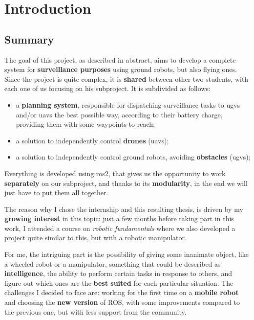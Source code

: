 \chapter{Introduction} %
\label{cha:intro}

\section{Summary}

The goal of this project, as described in abstract, aims to develop a complete system for \textbf{surveillance purposes} using ground robots, but also flying ones. Since the project is quite complex, it is \textbf{shared} between other two students, with each one of us focusing on his subproject. It is subdivided as follows: 

\begin{itemize}
  \item a \textbf{planning system}, responsible for dispatching surveillance tasks to \acrfull{ugvs} and/or \acrfull{uavs} the best possible way, according to their battery charge, providing them with some waypoints to reach; 
  \item a solution to independently control \textbf{drones} (\acrshort{uavs});
  \item a solution to independently control ground robots, avoiding \textbf{obstacles} (\acrshort{ugvs});
\end{itemize}

Everything is developed using \acrshort{ros}2, that gives us the opportunity to work \textbf{separately} on our subproject, and thanks to its \textbf{modularity}, in the end we will just have to put them all together.

The reason why I chose the internship and this resulting thesis, is driven by my \textbf{growing interest} in this topic: just a few months before taking part in this work, I attended a course on \textit{robotic fundamentals}\cite{intro2robotics} where we also developed a project quite similar to this, but with a robotic manipulator.

For me, the intriguing part is the possibility of giving some inanimate object, like a wheeled robot or a manipulator, something that could be described as \textbf{intelligence}, the ability to perform certain tasks in response to others, and figure out which ones are the \textbf{best suited} for each particular situation. The challenges I decided to face are: working for the first time on a \textbf{mobile robot} and choosing the \textbf{new version} of ROS, with some improvements compared to the previous one, but with less support from the community.

